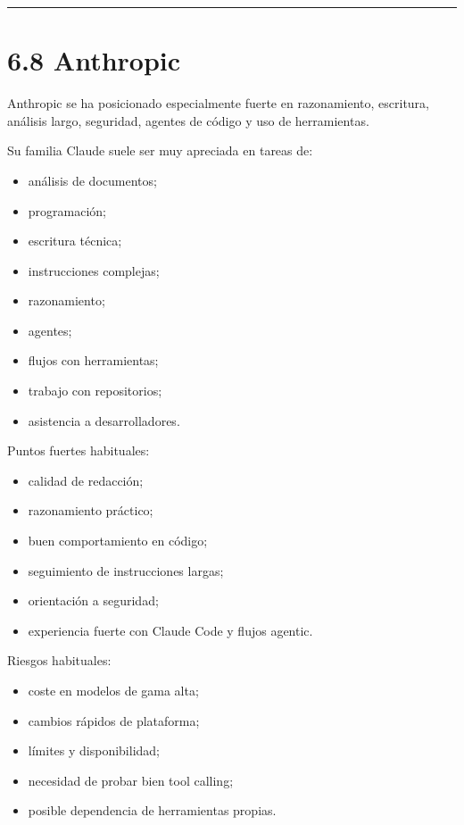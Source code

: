 \begin{center}\rule{0.5\linewidth}{0.5pt}\end{center}

\section{6.8 Anthropic}\label{anthropic}

Anthropic se ha posicionado especialmente fuerte en razonamiento,
escritura, análisis largo, seguridad, agentes de código y uso de
herramientas.

Su familia Claude suele ser muy apreciada en tareas de:

\begin{itemize}
\tightlist
\item
  análisis de documentos;
\item
  programación;
\item
  escritura técnica;
\item
  instrucciones complejas;
\item
  razonamiento;
\item
  agentes;
\item
  flujos con herramientas;
\item
  trabajo con repositorios;
\item
  asistencia a desarrolladores.
\end{itemize}

Puntos fuertes habituales:

\begin{itemize}
\tightlist
\item
  calidad de redacción;
\item
  razonamiento práctico;
\item
  buen comportamiento en código;
\item
  seguimiento de instrucciones largas;
\item
  orientación a seguridad;
\item
  experiencia fuerte con Claude Code y flujos agentic.
\end{itemize}

Riesgos habituales:

\begin{itemize}
\tightlist
\item
  coste en modelos de gama alta;
\item
  cambios rápidos de plataforma;
\item
  límites y disponibilidad;
\item
  necesidad de probar bien tool calling;
\item
  posible dependencia de herramientas propias.
\end{itemize}

